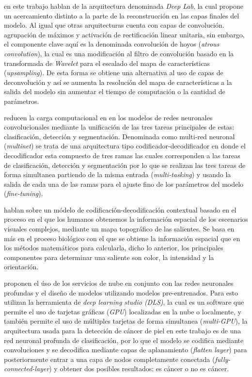 \citet{DBLP:journals/corr/ChenPK0Y16} en este trabajo hablan de la arquitectura denominada \emph{Deep Lab}, la cual propone un acercamiento distinto a la parte de la reconstrucción en las capas finales del modelo. Al igual que otras arquitecturas cuenta con capas de convolución. agrupación de máximos y activación de rectificación linear unitaria, sin embargo, el componente clave aquí es la denominada convolución de hoyos (\emph{atrous convolution}), la cual es una modificación al filtro de convolución basado en la transformada de \emph{Wavelet} para el escalado del mapa de características (\emph{upsampling}). De esta forma se obtiene una alternativa al uso de capas de deconvolución y así se aumenta la resolución del mapa de características a la salida del modelo sin aumentar el tiempo de computación o la cantidad de parámetros.

\citet{DBLP:journals/corr/TeichmannWZCU16} reducen la carga computacional en en los modelos de redes neuronales convolucionales mediante la unificación de las tres tareas principales de estas: clasificación, detección y segmentación. Denominada como multi-red neuronal (\emph{multinet}) se trata de una arquitectura tipo codificador-decodificador en donde el decodificador esta compuesto de tres ramas las cuales corresponden a las tareas de clasificación, detección y segmentación por lo que se realizan las tres tareas de forma simultanea partiendo de la misma entrada (\emph{multi-tasking}) y usando la salida de cada una de las ramas para el ajuste fino de los parámetros del modelo (\emph{fine-tuning}).  

\citet{KRONER2020261} hablan sobre un módelo de codificación-decodificación contextual basado en el proceso en el que los humanos obtenemos la información espacial de los escenarios visuales complejos, mediante un mapa topográfico de las salientes. Se basa en más en el proceso biológico con el que se obtiene la información espacial que en los métodos matemáticos para calcularla, dicho lo anterior, los principales componentes para determinar una saliente son color, la intensidad y la orientación.  

\citet{KADAMPUR2020100282} proponen el úso de los servicios de nube en conjunto con las redes neuronales profundas y el diseño de modelos utilizando modelos pre-entrenados. Para esto utilizan la herramienta de \emph{deep learning studio (DLS)}, la cual es un software que permite el uso de tarjetas gráficas (\emph{GPU}) localizadas en la nube o localmente, y también permite el uso de múltiples tarjetas de forma simultanea (\emph{multi-GPU}), la arquitectura usada para la detección de cáncer de piel en este trabajo es de una red neuronal profunda de clasificación, por lo que el modelo se codifica mediante convoluciones y se decodifica mediante capas de aplanamiento (\emph{flatten layer}) para posteriormente entrar a una capa de nodos completamente conectada (\emph{fully-connected-layer}) y obtener dos posibles resultados: es cáncer o no es cáncer.


